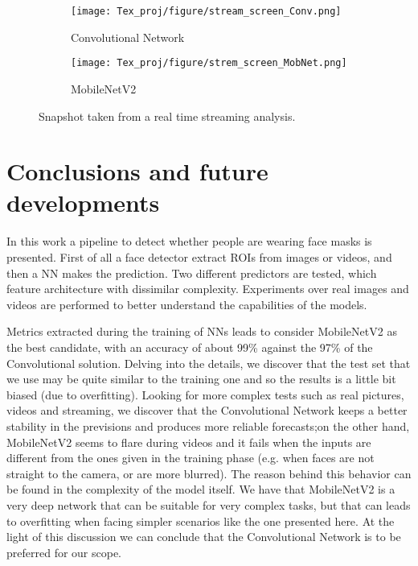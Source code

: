\documentclass[10pt,twocolumn,letterpaper]{article}
\begin{document}
\begin{figure}[htp]
     \centering
     \begin{subfigure}[b]{0.5\textwidth}
         \centering
         \texttt{[image: Tex\_proj/figure/stream\_screen\_Conv.png]}
         \caption{Convolutional Network}
         \label{fig:stream_conv}
     \end{subfigure}
     \begin{subfigure}[b]{0.5\textwidth}
         \centering
         \texttt{[image: Tex\_proj/figure/strem\_screen\_MobNet.png]}
         \caption{MobileNetV2}
         \label{fig:stream_MN}
     \end{subfigure}
     \caption{Snapshot taken from a real time streaming analysis.}
     \label{fig:stream}
\end{figure}

\section{Conclusions and future developments}
In this work a pipeline to detect whether people are wearing face masks is presented. First of all a face detector extract ROIs from images or videos, and then a NN makes the prediction. Two different predictors are tested, which feature architecture with dissimilar complexity. Experiments over real images and videos are performed to better understand the capabilities of the models.

Metrics extracted during the training of NNs leads to consider MobileNetV2 as the best candidate, with an accuracy of about 99\% against the 97\% of the Convolutional solution. Delving into the details, we discover that the test set that we use may be quite similar to the training one and so the results is a little bit biased (due to overfitting). Looking for more complex tests such as real pictures, videos and streaming, we discover that the Convolutional Network keeps a better stability in the previsions and produces more reliable forecasts;on the other hand, MobileNetV2 seems to flare during videos and it fails when the inputs are different from the ones given in the training phase (e.g. when faces are not straight to the camera, or are more blurred). The reason behind this behavior can be found in the complexity of the model itself. We have that MobileNetV2 is a very deep network that can be suitable for very complex tasks, but that can leads to overfitting when facing simpler scenarios like the one presented here. At the light of this discussion we can conclude that the Convolutional Network is to be preferred for our scope.
\end{document}
